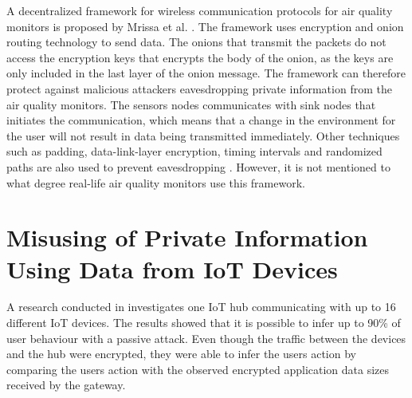 A decentralized framework for wireless communication protocols for air quality monitors is proposed by Mrissa et al. \cite{PrivacyAndFrameworkDecentAQM}. The framework uses encryption and onion routing technology to send data. The onions that transmit the packets do not access the encryption keys that encrypts the body of the onion, as the keys are only included in the last layer of the onion message. The framework can therefore protect against malicious attackers eavesdropping private information from the air quality monitors. The sensors nodes communicates with sink nodes that initiates the communication, which means that a change in the environment for the user will not result in data being transmitted immediately. Other techniques such as padding, data-link-layer encryption, timing intervals and randomized paths are also used to prevent eavesdropping \cite{PrivacyAndFrameworkDecentAQM}. However, it is not mentioned to what degree real-life air quality monitors use this framework. 

\section{Misusing of Private Information Using Data from \gls{IoT} Devices}
A research conducted in \cite{PassiveInferenceIoT} investigates one \gls{IoT} hub communicating with up to 16 different \gls{IoT} devices. The results showed that it is possible to infer up to 90\% of user behaviour with a passive attack. Even though the traffic between the devices and the hub were encrypted, they were able to infer the users action by comparing the users action with the observed encrypted application data sizes received by the gateway. 

